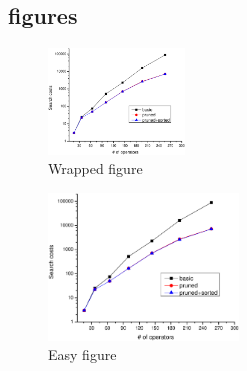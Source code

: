 \subsection{figures}
\begin{figure}
\centering
\includegraphics[width=0.324\textwidth]{figures2/eff_rand_num_sample0.5.eps}
\caption{Wrapped figure}
\label{fig:perf}
\end{figure}

\ifdefined\TTUT
\begin{figure}[!ht]
\begin{center}
    \includegraphics[angle=90, width=0.45\textwidth]{figures2/eff_rand_num_sample0.5.eps}%
\end{center}
\caption{Easy figure}\label{fig:easy}
\vspace{-0.10in}\end{figure}

